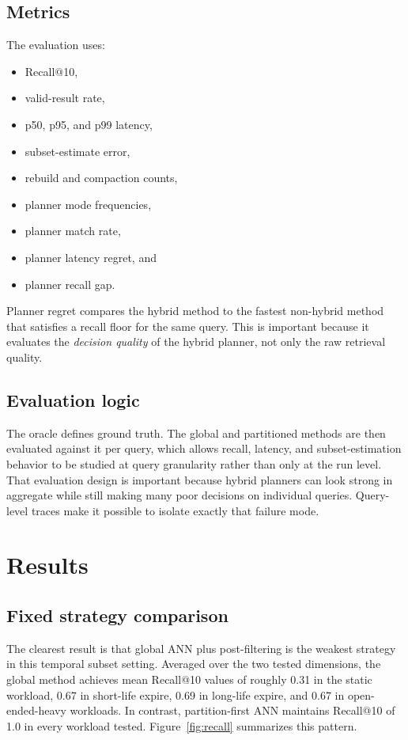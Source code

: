 \documentclass[sigconf,nonacm]{acmart}
\begin{document}
\subsection{Metrics}

The evaluation uses:
\begin{itemize}[leftmargin=*,nosep]
    \item Recall@10,
    \item valid-result rate,
    \item p50, p95, and p99 latency,
    \item subset-estimate error,
    \item rebuild and compaction counts,
    \item planner mode frequencies,
    \item planner match rate,
    \item planner latency regret, and
    \item planner recall gap.
\end{itemize}

Planner regret compares the hybrid method to the fastest non-hybrid method that satisfies a recall floor for the same query. This is important because it evaluates the \emph{decision quality} of the hybrid planner, not only the raw retrieval quality.

\subsection{Evaluation logic}

The oracle defines ground truth. The global and partitioned methods are then evaluated against it per query, which allows recall, latency, and subset-estimation behavior to be studied at query granularity rather than only at the run level. That evaluation design is important because hybrid planners can look strong in aggregate while still making many poor decisions on individual queries. Query-level traces make it possible to isolate exactly that failure mode.

\section{Results}

\subsection{Fixed strategy comparison}

The clearest result is that global ANN plus post-filtering is the weakest strategy in this temporal subset setting. Averaged over the two tested dimensions, the global method achieves mean Recall@10 values of roughly 0.31 in the static workload, 0.67 in short-life expire, 0.69 in long-life expire, and 0.67 in open-ended-heavy workloads. In contrast, partition-first ANN maintains Recall@10 of 1.0 in every workload tested. Figure~\ref{fig:recall} summarizes this pattern.
\end{document}
